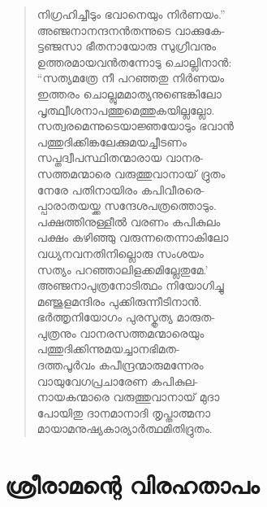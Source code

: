 \begin{verse}
നിഗ്രഹിച്ചീടും ഭവാനെയും നിര്‍ണയം.”\\
അഞ്ജനാനന്ദനന്‍തന്നുടെ വാക്കുകേ-\\
ട്ടഞ്ജസാ ഭീതനായോരു സുഗ്രീവനും\\
ഉത്തരമായവന്‍തന്നോടു ചൊല്ലിനാന്‍:\\
“സത്യമത്രേ നീ പറഞ്ഞതു നിര്‍ണയം\\
ഇത്തരം ചൊല്ലുമമാത്യനുണ്ടെങ്കിലോ\\
പൃത്ഥ്വീശനാപത്തുമെത്തുകയില്ലല്ലോ.\\
സത്വരമെന്നുടെയാജ്ഞയോടും ഭവാന്‍\\
പത്തുദിക്കിങ്കലേക്കുമയച്ചീടണം\\
സപ്തദ്വീപസ്ഥിതന്മാരായ വാനര-\\
സത്തമന്മാരെ വരുത്തുവാനായ് ദ്രുതം\\
നേരേ പതിനായിരം കപിവീരരെ-\\
പ്പാരാതയയ്ക്ക സന്ദേശപത്രത്തൊടും.\\
പക്ഷത്തിനുള്ളീല്‍ വരണം കപികുലം\\
പക്ഷം കഴിഞ്ഞു വരുന്നതെന്നാകിലോ\\
വധ്യനവനതിനില്ലൊരു സംശയം\\
സത്യം പറഞ്ഞാലിളക്കമില്ലേതുമേ.’\\
അഞ്ജനാപുത്രനോടിത്ഥം നിയോഗിച്ചു\\
മഞ്ജുളമന്ദിരം പുക്കിരുന്നീടിനാന്‍.\\
ഭര്‍ത്തൃനിയോഗം പുരസ്കൃത്യ മാരുത-\\
പുത്രനും വാനരസത്തമന്മാരെയും\\
പത്തുദിക്കിന്നുമയച്ചാനഭിമത-\\
ദത്തപൂര്‍വം കപീന്ദ്രന്മാരുമന്നേരം\\
വായുവേഗപ്രചാരേണ കപികുല-\\
നായകന്മാരെ വരുത്തുവാനായ് മുദാ\\
പോയിതു ദാനമാനാദി തൃപ്താത്മനാ\\
മായാമനുഷ്യകാര്യാര്‍ത്ഥമിതിദ്രുതം.
\end{verse}


\section{ശ്രീരാമന്റെ വിരഹതാപം}

